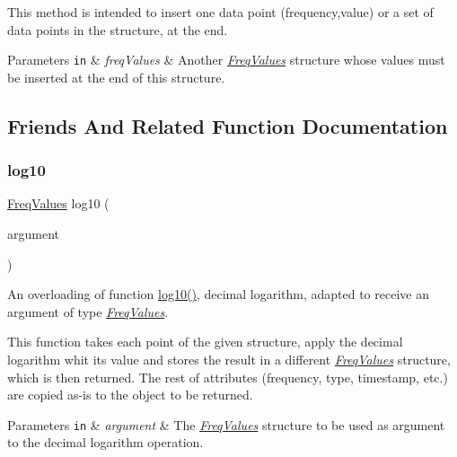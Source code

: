 This method is intended to insert one data point (frequency,value) or a set of data points in the structure, at the end. 


\begin{DoxyParams}[1]{Parameters}
\mbox{\tt in}  & {\em freq\+Values} & Another {\itshape \hyperlink{structFreqValues}{Freq\+Values}} structure whose values must be inserted at the end of this structure. \\
\hline
\end{DoxyParams}


\subsection{Friends And Related Function Documentation}
\mbox{\label{structFreqValues_a90781867604621a99e59d4fcdc4a5f38}} 
\subsubsection{\texorpdfstring{log10}{log10}}
{\footnotesize\ttfamily \hyperlink{structFreqValues}{Freq\+Values} log10 (\begin{DoxyParamCaption}\item[{const \hyperlink{structFreqValues}{Freq\+Values} \&}]{argument }\end{DoxyParamCaption})\hspace{0.3cm}{\ttfamily [friend]}}



An overloading of function {\ttfamily \hyperlink{structFreqValues_a90781867604621a99e59d4fcdc4a5f38}{log10()}}, decimal logarithm, adapted to receive an argument of type {\itshape \hyperlink{structFreqValues}{Freq\+Values}}. 

This function takes each point of the given structure, apply the decimal logarithm whit its value and stores the result in a different {\itshape \hyperlink{structFreqValues}{Freq\+Values}} structure, which is then returned. The rest of attributes (frequency, type, timestamp, etc.) are copied as-\/is to the object to be returned. 
\begin{DoxyParams}[1]{Parameters}
\mbox{\tt in}  & {\em argument} & The {\itshape \hyperlink{structFreqValues}{Freq\+Values}} structure to be used as argument to the decimal logarithm operation. \\
\hline
\end{DoxyParams}
\mbox{\label{structFreqValues_a3e567844a5d4347e3b30e696132bfb7c}} 
